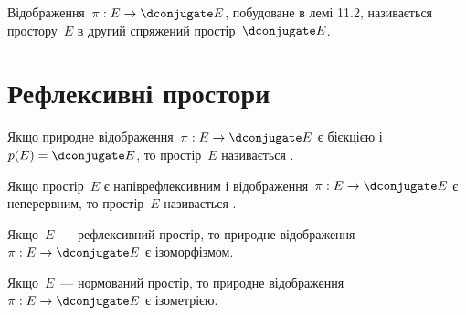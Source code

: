 \begin{definition}
    Відображення~$\pi: E \to \dconjugate E$, побудоване в \error лемі 11.2, називається  простору~$E$ в другий спряжений простір~$\dconjugate E$.
\end{definition}

\section{Рефлексивні простори}

\begin{definition}
    Якщо природне відображення~$\pi: E \to \dconjugate E$ є бієкцією і~$p(E) = \dconjugate E$, то простір~$E$ називається .
\end{definition}

\begin{definition}
    Якщо простір~$E$ є напіврефлексивним і відображення~$\pi: E \to \dconjugate E$ є неперервним, то простір~$E$ називається .
\end{definition}

\begin{remark}
    Якщо~$E$~--- рефлексивний простір, то природне відображення~$\pi: E \to \dconjugate E$ є ізоморфізмом.
\end{remark}

\begin{theorem}
    Якщо~$E$~--- нормований простір, то природне відображення~$\pi: E \to \dconjugate E$ є ізометрією.
\end{theorem}

